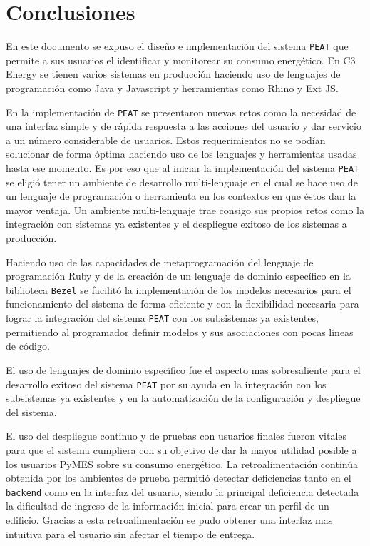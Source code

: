 \chapter{Conclusiones}

En este documento se expuso el diseño e implementación del sistema \texttt{PEAT} que
permite a sus usuarios el identificar y monitorear su consumo energético. En C3
Energy se tienen varios sistemas en producción haciendo uso de lenguajes de
programación como Java y Javascript y herramientas como Rhino y Ext JS.

En la implementación de \texttt{PEAT} se presentaron nuevas retos como la necesidad
de una interfaz simple y de rápida respuesta a las acciones del usuario y
dar servicio a un número considerable de usuarios.
Estos requerimientos no se podían solucionar de forma óptima haciendo uso de los
lenguajes y herramientas usadas hasta ese momento. Es por eso que al iniciar
la implementación del sistema \texttt{PEAT} se eligió tener un ambiente de
desarrollo multi-lenguaje en el cual se hace uso de un lenguaje de programación
o herramienta en los contextos en que éstos dan la mayor ventaja. Un ambiente
multi-lenguaje trae consigo sus propios retos como la integración con sistemas ya
existentes y el despliegue exitoso de los sistemas a producción.

Haciendo uso de las capacidades de metaprogramación del lenguaje de programación
Ruby y de la creación de un lenguaje de dominio específico en la biblioteca
\texttt{Bezel} se facilitó la implementación de los modelos necesarios para
el funcionamiento del sistema de forma eficiente y con la flexibilidad necesaria
para lograr la integración del sistema \texttt{PEAT} con los subsistemas ya
existentes, permitiendo al programador definir modelos y sus asociaciones con
pocas líneas de código.

El uso de lenguajes de dominio específico fue el aspecto mas sobresaliente
para el desarrollo exitoso del sistema \texttt{PEAT} por su ayuda en la
integración con los subsistemas ya existentes y en la automatización de la
configuración y despliegue del sistema.

El uso del despliegue continuo y de pruebas con usuarios finales fueron vitales para
que el sistema cumpliera con su objetivo de dar la mayor utilidad posible
a los usuarios PyMES sobre su consumo energético. La retroalimentación continúa
obtenida por los ambientes de prueba permitió detectar deficiencias tanto en el
\texttt{backend} como en la interfaz del usuario, siendo la principal deficiencia
detectada la dificultad de ingreso de la información inicial para crear un perfil
de un edificio. Gracias a esta retroalimentación se pudo obtener una interfaz
mas intuitiva para el usuario sin afectar el tiempo de entrega.

